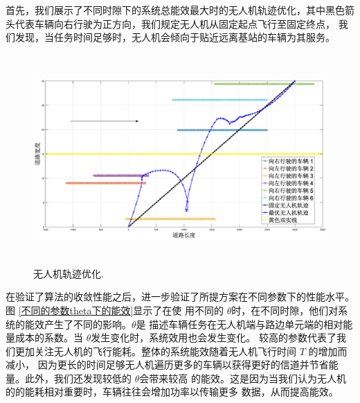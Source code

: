 首先，我们展示了不同时隙下的系统总能效最大时的无人机轨迹优化，其中黑色箭头代表车辆向右行驶为正方向，我们规定无人机从固定起点飞行至固定终点，
我们发现，当任务时间足够时，无人机会倾向于贴近远离基站的车辆为其服务。
\begin{figure}[H]
\centering
\includegraphics[width=16cm,height=8cm]{figures//chap4//小轨迹.eps}   %
\caption{无人机轨迹优化.}
\label{F67}
\end{figure}

在验证了算法的收敛性能之后，进一步验证了所提方案在不同参数下的性能水平。图 \ref{不同的参数theta下的能效}显示了在使
用不同的 $\theta$时，在不同时隙，他们对系统的能效产生了不同的影响。$\theta$是
描述车辆任务在无人机端与路边单元端的相对能量成本的系数。当 $\theta$发生变化时，系统效用也会发生变化。
较高的参数代表了我们更加关注无人机的飞行能耗。整体的系统能效随着无人机飞行时间 $T$ 的增加而减小，
因为更长的时间足够无人机遍历更多的车辆以获得更好的信道并节省能量。此外，我们还发现较低的 $\theta$会带来较高
的能效。这是因为当我们认为无人机的的能耗相对重要时，车辆往往会增加功率以传输更多
数据，从而提高能效。

